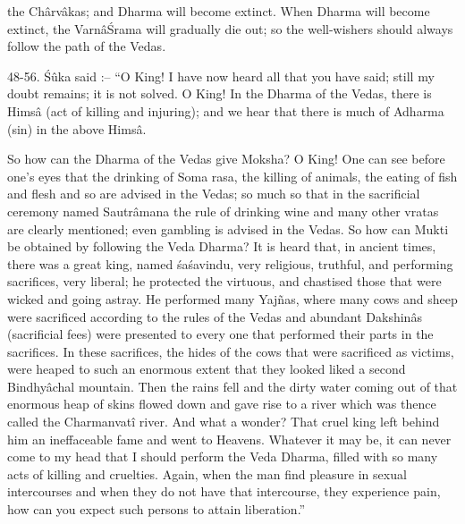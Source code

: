 the Ch\^arv\^akas; and Dharma will become extinct. When Dharma will become extinct, the Varn\^a\'Srama will gradually die out; so the well-wishers should always follow the path of the Vedas.

48-56. \'S\^uka said :-- ``O King! I have now heard all that you have said; still my doubt remains; it is not solved. O King! In the Dharma of the Vedas, there is Hims\^a (act of killing and injuring); and we hear that there is much of Adharma (sin) in the above Hims\^a.

So how can the Dharma of the Vedas give Moksha? O King! One can see before one's eyes that the drinking of Soma rasa, the killing of animals, the eating of fish and flesh and so are advised in the Vedas; so much so that in the sacrificial ceremony named Sautr\^amana the rule of drinking wine and many other vratas are clearly mentioned; even gambling is advised in the Vedas. So how can Mukti be obtained by following the Veda Dharma? It is heard that, in ancient times, there was a great king, named \'sa\'savindu, very religious, truthful, and performing sacrifices, very liberal; he protected the virtuous, and chastised those that were wicked and going astray. He performed many Yajñas, where many cows and sheep were sacrificed according to the rules of the Vedas and abundant Dakshin\^as (sacrificial fees) were presented to every one that performed their parts in the sacrifices. In these sacrifices, the hides of the cows that were sacrificed as victims, were heaped to such an enormous extent that they looked liked a second Bindhy\^achal mountain. Then the rains fell and the dirty water coming out of that enormous heap of skins flowed down and gave rise to a river which was thence called the Charmanvat\^i river. And what a wonder? That cruel king left behind him an ineffaceable fame and went to Heavens. Whatever it may be, it can never come to my head that I should perform the Veda Dharma, filled with so many acts of killing and cruelties. Again, when the man find pleasure in sexual intercourses and when they do not have that intercourse, they experience pain, how can you expect such persons to attain liberation.''

